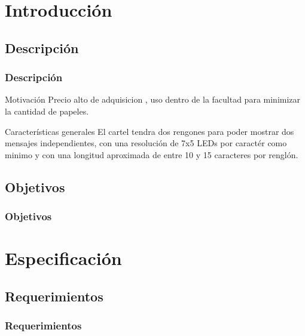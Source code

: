 \section{Introducción} 

\subsection{Descripción}
 

\begin{frame}
	\frametitle{Descripción}
	
		\begin{block}{Motivación}
			Precio alto de adquisicion , uso dentro de la facultad para minimizar la cantidad de papeles.
		\end{block}

		\begin{block}{Características generales}
			El cartel tendra dos rengones para poder mostrar dos mensajes independientes, con una resolución de 7x5 LEDs por caractér como minimo y con una longitud aproximada de entre 10 y 15 caracteres por renglón.
		\end{block}

\end{frame}

\subsection{Objetivos}
\begin{frame}
	\frametitle{Objetivos}

\end{frame}

\section{Especificación}

\subsection{Requerimientos}
\begin{frame}
	\frametitle{Requerimientos}

\end{frame}

